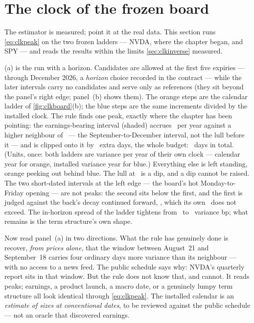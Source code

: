 \section{The clock of the frozen board}
\label{sec:clkfrozen}

The estimator is measured; point it at the real data.  This section
runs \eqref{eq:clkpeak} on the two frozen ladders --- NVDA, where the
chapter began, and SPY --- and reads the results within the limits
\cref{sec:clkinverse} measured.

(a) is the run with a horizon.  Candidates are allowed
at the first five expiries --- through December 2026, a
\emph{horizon} choice recorded in the contract --- while the later
intervals carry no candidates and serve only as references
(they sit beyond the panel's right edge; panel~(b) shows them).  The orange steps are the calendar ladder of
\cref{fig:clkboard}(b); the blue steps are the same increments
divided by the installed clock.  The rule finds one peak, exactly
where the chapter has been pointing: the earnings-bearing interval
(shaded) accrues \MacClkBoardHotFwd\ per year against a higher
neighbour of \MacClkReadHeroEarnAfter\ --- the September-to-December
interval, not the lull before it --- and is clipped onto it by
\MacClkReadHeroEarnD\ extra days, the whole budget:
\MacClkReadHeroTotalD\ days in total.  (Units, once: both ladders are
variance per year of their own clock --- calendar year for orange,
installed variance year for blue.)  Everything else is left standing,
orange peeking out behind blue.  The lull at
\MacClkReadHeroLullLevel\ is a dip, and a dip cannot be raised.  The
two short-dated intervals at the left edge --- the board's hot
Monday-to-Friday opening --- are not peaks: the second sits below
the first, and the first is judged against the back's decay
continued forward, \MacClkReadHeroFrontRef, which its own
\MacClkReadHeroFrontLevel\ does not exceed.  The in-horizon spread
of the ladder tightens from \MacClkReadHeroSpreadBeforeBp\ to
\MacClkReadHeroSpreadAfterBp\ variance bp; what remains is the
term structure's own shape.

Now read panel~(a) in two directions.  What the rule has
genuinely done is recover, \emph{from prices alone}, that the window
between August~21 and September~18 carries four ordinary days
more variance than its neighbour --- with no access to a news
feed.  The public schedule says why: NVDA's quarterly report sits in
that window.  But the rule does not know that, and cannot.  It
reads peaks; earnings, a product launch, a macro date, or a
genuinely lumpy term structure all look identical through
\eqref{eq:clkpeak}.  The installed calendar is an \emph{estimate of
sizes at conventional dates}, to be reviewed against the public
schedule --- not an oracle that discovered earnings.

